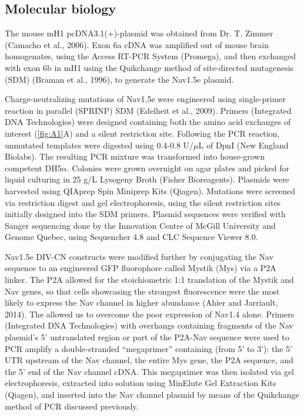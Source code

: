 \subsection{Molecular biology}
The mouse mH1 pcDNA3.1(+)-plasmid was obtained from Dr. T. Zimmer (Camacho et al., 2006). Exon 6a cDNA was amplified out of mouse brain homogenates, using the Access RT-PCR System (Promega), and then exchanged with exon 6b in mH1 using the Quikchange method of site-directed mutagenesis (SDM) (Braman et al., 1996), to generate the Nav1.5e plasmid.

Charge-neutralizing mutations of Nav1.5e were engineered using single-primer reaction in parallel (SPRINP) SDM (Edelheit et al., 2009). Primers (Integrated DNA Technologies) were designed containing both the amino acid exchanges of interest (\autoref{fig:A1}A) and a silent restriction site. Following the PCR reaction, unmutated templates were digested using 0.4-0.8 U/$\mu$L of DpnI (New England Biolabs). The resulting PCR mixture was transformed into house-grown competent DH5$\alpha$. Colonies were grown overnight on agar plates and picked for liquid culturing in 25 g/L Lysogeny Broth (Fisher Bioreagents). Plasmids were harvested using QIAprep Spin Miniprep Kits (Qiagen). Mutations were screened via restriction digest and gel electrophoresis, using the silent restriction sites initially designed into the SDM primers. Plasmid sequences were verified with Sanger sequencing done by the Innovation Centre of McGill University and Genome Quebec, using Sequencher 4.8 and CLC Sequence Viewer 8.0.

Nav1.5e DIV-CN constructs were modified further by conjugating the Nav sequence to an engineered GFP fluorophore called Mystik (Mys) via a P2A linker. The P2A allowed for the stoichiometric 1:1 translation of the Mystik and Nav genes, so that cells showcasing the strongest fluorescence were the most likely to express the Nav channel in higher abundance (Ahier and Jarriault, 2014). The allowed us to overcome the poor expression of Nav1.4 alone. Primers (Integrated DNA Technologies) with overhangs containing fragments of the Nav plasmid’s 5’ untranslated region or part of the P2A-Nav sequence were used to PCR amplify a double-stranded “megaprimer” containing (from 5’ to 3’): the 5’ UTR upstream of the Nav channel, the entire Mys gene, the P2A sequence, and the 5’ end of the Nav channel cDNA. This megaprimer was then isolated via gel electrophoresis, extracted into solution using MinElute Gel Extraction Kits (Qiagen), and inserted into the Nav channel plasmid by means of the Quikchange method of PCR discussed previously.

